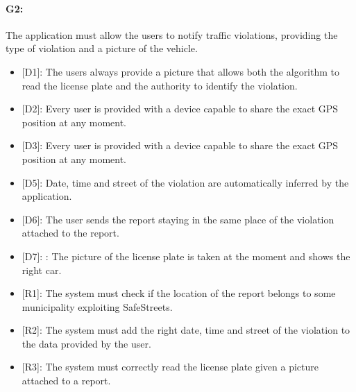 \documentclass[12pt,a4paper]{report}
\begin{document}
			\paragraph {G2:} The application must allow the users to notify traffic violations, providing the type of violation and a picture of the vehicle.
			\begin{itemize}
				\item{[D1]:} The users always provide a picture that allows both the algorithm to read the license plate and the authority to identify the violation.
				\item{[D2]:} Every user is provided with a device capable to share the exact GPS position at any moment.
				\item{[D3]:} Every user is provided with a device capable to share the exact GPS position at any moment.
				\item{[D5]:} Date, time and street of the violation are automatically inferred by the application.
				\item{[D6]:} The user sends the report staying in the same place of the violation attached to the report.
		 		\item{[D7]:} : The picture of the license plate is taken at the moment and shows the right car.
			\end{itemize}
			\begin{itemize}
				\item{[R1]:} The system must check if the location of the report belongs to some municipality exploiting SafeStreets.
				\item{[R2]:} The system must add the right date, time and street of the violation to the data provided by the user.
				\item{[R3]:} The system must correctly read the license plate given a picture attached to a report.
			\end{itemize}
\end{document}
